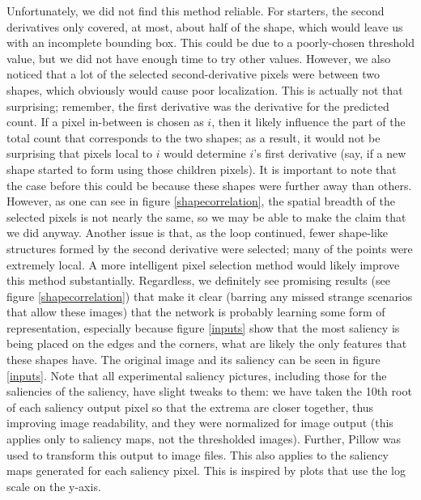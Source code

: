 Unfortunately, we did not find this method reliable. For starters, the second derivatives only
covered, at most, about half of the shape, which would leave us with an incomplete bounding box.
This could be due to a poorly-chosen threshold value, but we did not have enough time to try other
values. However, we also noticed that a lot of the selected second-derivative pixels were between
two shapes, which obviously would cause poor localization. This is actually not that surprising;
remember, the first derivative was the derivative for the predicted count. If a pixel in-between is
chosen as $i$, then it likely influence the part of the total count that corresponds to the two
shapes; as a result, it would not be surprising that pixels local to $i$ would determine $i$'s first
derivative (say, if a new shape started to form using those children pixels). It is important to
note that the case before this could be because these shapes were further away than others. However,
as one can see in figure \ref{shapecorrelation}, the spatial breadth of the selected pixels is not
nearly the same, so we may be able to make the claim that we did anyway. Another issue is that, as
the loop continued, fewer shape-like structures formed by the second derivative were selected; many
of the points were extremely local. A more intelligent pixel selection method would likely improve
this method substantially. Regardless, we definitely see promising results (see figure
\ref{shapecorrelation}) that make it clear (barring any missed strange scenarios that allow these
images) that the network is probably learning some form of representation, especially because figure
\ref{inputs} show that the most saliency is being placed on the edges and the corners, what are
likely the only features that these shapes have. The original image and its saliency can be seen in
figure \ref{inputs}. Note that all experimental saliency pictures, including those for the
saliencies of the saliency, have slight tweaks to them: we have taken the 10th root of each saliency
output pixel so that the extrema are closer together, thus improving image readability, and they
were normalized for image output (this applies only to saliency maps, not the thresholded images).
Further, Pillow was used to transform this output to image files. This also applies to the saliency
maps generated for each saliency pixel. This is inspired by plots that use the log scale on the
y-axis.

